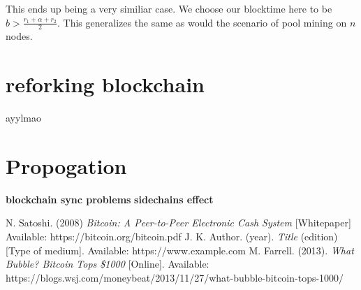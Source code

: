 \documentclass[conference]{IEEEtran}
\begin{document}
This ends up being a very similiar case. We choose our blocktime here to be $b > \frac{r_1 + \alpha + r_2}{2}$. This generalizes the same as would the scenario of pool mining on $n$ nodes.


\section{reforking blockchain}
ayylmao

\section{Propogation}
\textbf{blockchain sync problems}
\lipsum[1-2]
\textbf{sidechains effect}
\lipsum[1-2]


\begin{thebibliography}{9}
	
	N. Satoshi. 
	(2008)
	\textit{Bitcoin: A Peer-to-Peer Electronic Cash System}
	[Whitepaper]
	Available: https://bitcoin.org/bitcoin.pdf
	J. K. Author. 
	(year).	
	\textit{Title}
	(edition)
	[Type of medium].
	Available: https://www.example.com
	M. Farrell. 
	(2013).	
	\textit{What Bubble? Bitcoin Tops \$1000}
	[Online].
	Available: https://blogs.wsj.com/moneybeat/2013/11/27/what-bubble-bitcoin-tops-1000/

\end{thebibliography}
\end{document}
